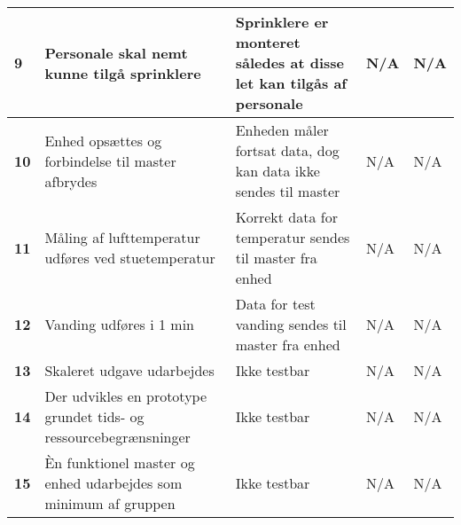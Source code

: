 \begin{center}
\begin{longtable}{|p{}|p{}|p{}|p{}|p{}|}
\textbf{9}	&Personale skal nemt kunne tilgå sprinklere
			&Sprinklere er monteret således at disse let kan tilgås af personale
			&N/A
			&N/A \\ \hline 
			
			
\textbf{10}	&Enhed opsættes og forbindelse til master afbrydes
			&Enheden måler fortsat data, dog kan data ikke sendes til master
			&N/A
			&N/A \\ \hline 
			
\textbf{11}	&Måling af lufttemperatur udføres ved stuetemperatur
			&Korrekt data for temperatur sendes til master fra enhed
			&N/A
			&N/A \\ \hline 
			
\textbf{12}	&Vanding udføres i 1 min 
			&Data for test vanding sendes til master fra enhed
			&N/A
			&N/A \\ \hline 
			
			
\textbf{13}	&Skaleret udgave udarbejdes
			&Ikke testbar
			&N/A
			&N/A \\ \hline 
			
\textbf{14}	&Der udvikles en prototype grundet tids- og ressourcebegrænsninger
			&Ikke testbar
			&N/A
			&N/A \\ \hline 
			
\textbf{15}	&Èn funktionel master og enhed udarbejdes som minimum af gruppen
			&Ikke testbar
			&N/A
			&N/A \\ \hline 
			
\end{longtable}
	\label{ATIFKrav} 
\end{center}


